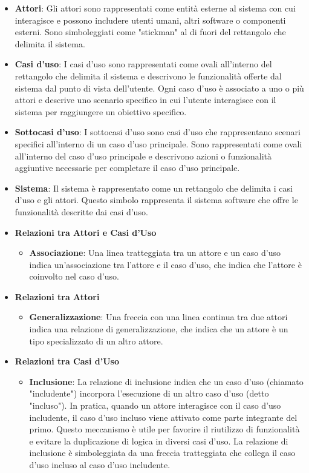 \begin{itemize}
	\item \textbf{Attori}: Gli attori sono rappresentati come entità esterne al sistema con cui interagisce e possono includere utenti umani, altri software o componenti esterni. Sono simboleggiati come "stickman" al di fuori del rettangolo che delimita il sistema.
	\item \textbf{Casi d'uso}: I casi d'uso sono rappresentati come ovali all'interno del rettangolo che delimita il sistema e descrivono le funzionalità offerte dal sistema dal punto di vista dell'utente. Ogni caso d'uso è associato a uno o più attori e descrive uno scenario specifico in cui l'utente interagisce con il sistema per raggiungere un obiettivo specifico.
	\item \textbf{Sottocasi d'uso}: I sottocasi d'uso sono casi d'uso che rappresentano scenari specifici all'interno di un caso d'uso principale. Sono rappresentati come ovali all'interno del caso d'uso principale e descrivono azioni o funzionalità aggiuntive necessarie per completare il caso d'uso principale.
	\item \textbf{Sistema}: Il sistema è rappresentato come un rettangolo che delimita i casi d'uso e gli attori. Questo simbolo rappresenta il sistema software che offre le funzionalità descritte dai casi d'uso.
	\item \textbf{Relazioni tra Attori e Casi d'Uso}
	\begin{itemize}
		\item \textbf{Associazione}: Una linea tratteggiata tra un attore e un caso d'uso indica un'associazione tra l'attore e il caso d'uso, che indica che l'attore è coinvolto nel caso d'uso.
	\end{itemize}
	\item \textbf{Relazioni tra Attori}
	\begin{itemize}
		\item \textbf{Generalizzazione}: Una freccia con una linea continua tra due attori indica una relazione di generalizzazione, che indica che un attore è un tipo specializzato di un altro attore.
	\end{itemize} 
	\item \textbf{Relazioni tra Casi d'Uso}
	\begin{itemize}
		\item \textbf{Inclusione}: La relazione di inclusione indica che un caso d'uso (chiamato "includente") incorpora l'esecuzione di un altro caso d'uso (detto "incluso"). In pratica, quando un attore interagisce con il caso d'uso includente, il caso d'uso incluso viene attivato come parte integrante del primo. Questo meccanismo è utile per favorire il riutilizzo di funzionalità e evitare la duplicazione di logica in diversi casi d'uso. La relazione di inclusione è simboleggiata da una freccia tratteggiata che collega il caso d'uso incluso al caso d'uso includente.

\end{itemize}
\end{itemize}
